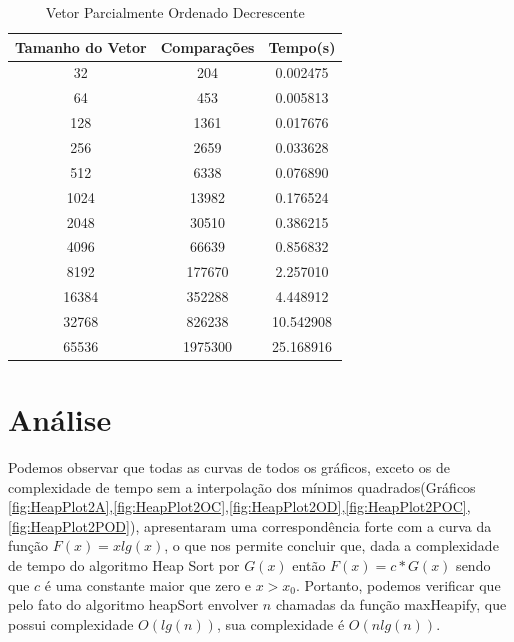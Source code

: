 \documentclass[12pt,a4paper,twoside]{report}
\begin{document}
\begin{table}[h]
  \centering
  \caption{Vetor Parcialmente Ordenado Decrescente \label{tab:pod}}
  \begin{tabular}{ccc} \\\hline
  \textbf{Tamanho do Vetor} & \textbf{Comparações} & \textbf{Tempo(s)}  \\\hline
  32                        & 204                  & 0.002475          \\\hline
  64                        & 453                 & 0.005813          \\\hline
  128                       & 1361                 & 0.017676          \\\hline
  256                       & 2659                & 0.033628          \\\hline
  512                       & 6338               & 0.076890          \\\hline
  1024                      & 13982               & 0.176524          \\\hline
  2048                      & 30510              & 0.386215          \\\hline
  4096                      & 66639              & 0.856832         \\\hline
  8192                      & 177670             & 2.257010        \\\hline
  16384                     & 352288            & 4.448912        \\\hline
  32768                     & 826238            & 10.542908        \\\hline
  65536                     & 1975300            & 25.168916        \\\hline

  \end{tabular}
\end{table}


\chapter{Análise}

Podemos observar que todas as curvas de todos os gráficos, exceto os de complexidade de tempo sem a interpolação dos mínimos quadrados(Gráficos \ref{fig:HeapPlot2A},\ref{fig:HeapPlot2OC},\ref{fig:HeapPlot2OD},\ref{fig:HeapPlot2POC},\ref{fig:HeapPlot2POD}), apresentaram uma correspondência forte com a curva da função $F(x) = x lg(x)$, o que nos permite concluir que, dada a complexidade de tempo do algoritmo Heap Sort por $G(x)$ então $F(x) = c * G(x)$ sendo que $c$ é uma constante maior que zero e $x > x_0$. Portanto, podemos verificar que pelo fato do algoritmo heapSort envolver $n$ chamadas da função maxHeapify, que possui complexidade $O(lg(n))$, sua complexidade é $O(n lg(n))$.
\end{document}
